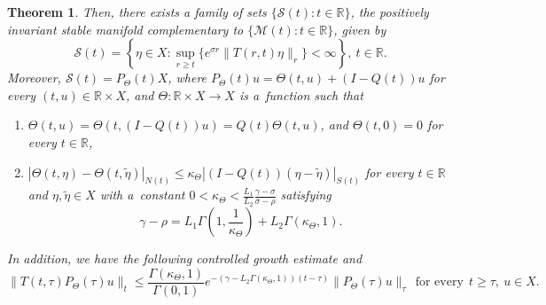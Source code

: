 \documentclass[a4paper,11pt,reqno]{amsart}
\theoremstyle{plain}
\newtheorem{thm}[lem]{Theorem}
\theoremstyle{definition}
\numberwithin{equation}{section}
\newcommand{\R}{\mathbb{R}}
\newcommand{\calm}{\mathcal M}
\renewcommand{\geq}{\geqslant}
\renewcommand{\leq}{\leqslant}
\begin{document}
\begin{thm}
    Then, there exists a family of sets $\{\mathcal{S}(t)\colon t\in \R\}$, the positively invariant stable manifold complementary to $\{ \calm(t)\colon t\in \R\}$, given by 
    \begin{equation}\label{eq-stable-manifold-characterization}
    \mathcal{S}(t)=\left\{\eta\in X\colon  \sup_{r\geq {t}} \{e^{\sigma r}\|T(r,t)\eta\|_r\}<\infty\right\},\ {t\in\R}.
\end{equation}
Moreover, $\mathcal{S}(t)=P_\Theta(t)X$, 
where {$P_\Theta(t)u=\Theta(t,u)+(I-Q(t))u$ for every $(t,u)\in\R\times X$, and} $\Theta\colon\mathbb{R}\times X \to X$ is a~function such that 
\begin{enumerate}
\item $\Theta(t,u)=\Theta(t,(I-Q(t))u)=Q(t)\Theta(t,u)$, 
and $\Theta(t, 0)=0$ for every $t\in\mathbb{R}$,
\item $|\Theta(t,\eta)-\Theta(t,\tilde{\eta})|_{N(t)}\leq \kappa_\Theta|(I-Q(t))(\eta-{\tilde{\eta}})|_{S(t)}$ for every $t\in \R$ {and $\eta,\tilde{\eta}\in X$ with} a~constant $0<\kappa_\Theta < \frac{L_1}{L_2}\frac{\gamma-\sigma}{\sigma-\rho}$ satisfying
\begin{equation}\label{e:KAPPATHETA}
\gamma-\rho=L_1\Gamma\left(1,\frac{1}{\kappa_\Theta}\right)+L_2\Gamma(\kappa_\Theta,1).
\end{equation}
\end{enumerate}
In addition, we have the following controlled growth estimate 
and 
\begin{equation}\label{DecayStM}
    \|T(t,\tau)P_{\Theta}(\tau)u\|_t \leq \frac{\Gamma(\kappa_\Theta,1)}{\Gamma(0,1)}e^{-(\gamma- L_2\Gamma(\kappa_\Theta,1))(t-\tau)}\|P_{\Theta}(\tau)u\|_\tau\ \ \text{for every}\ \ t\geq \tau, \ u\in X.
\end{equation}
\end{thm}
\end{document}

